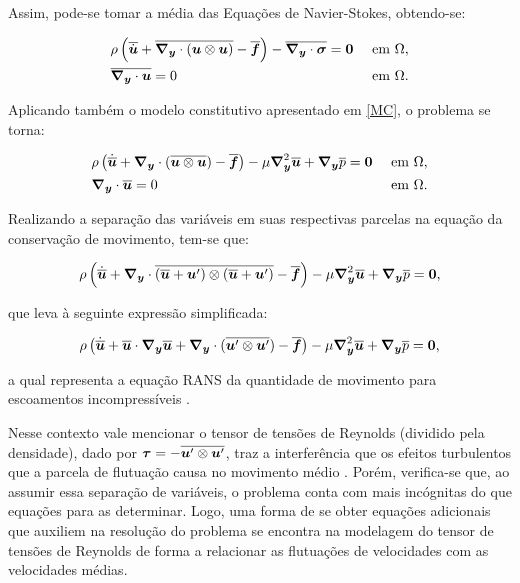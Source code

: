 Assim, pode-se tomar a média das Equações de Navier-Stokes, obtendo-se:

\begin{subequations}
    \begin{align}
         & \rho\left({\overline{\dot{\boldsymbol{u}}}+\overline{\boldsymbol{\nabla_y}\cdot(\boldsymbol{u}\otimes\boldsymbol{u})}-\overline{\boldsymbol{f}}}\right)-\overline{\boldsymbol{\nabla_y}\cdot\boldsymbol{\sigma}}=\boldsymbol{0} &  & \text{ em }\Omega\text{,} \\
         & \overline{\boldsymbol{\nabla_y}\cdot\boldsymbol{u}}=0                                                                                 &  & \text{ em }\Omega\text{.}
    \end{align}
\end{subequations}

Aplicando também o modelo constitutivo apresentado em \ref{MC}, o problema se torna:

\begin{subequations}
    \begin{align}
         & \rho\left({\dot{\overline{\boldsymbol{u}}}+\boldsymbol{\nabla_y}\cdot(\overline{\boldsymbol{u}\otimes\boldsymbol{u}})-\overline{\boldsymbol{f}}}\right)-\mu\boldsymbol{\nabla}^2_{\boldsymbol{y}}\overline{\boldsymbol{u}}+\boldsymbol{\nabla_y}\overline{p}=\boldsymbol{0} &  & \text{ em }\Omega\text{,} \\
         & \boldsymbol{\nabla_y}\cdot\overline{\boldsymbol{u}}=0                                                                                        &  & \text{ em }\Omega\text{.}
    \end{align}
\end{subequations}

Realizando a separação das variáveis em suas respectivas parcelas na equação da conservação de movimento, tem-se que:

\begin{equation}
    \rho\left({\dot{\overline{\boldsymbol{u}}}+\boldsymbol{\nabla_y}\cdot\overline{(\overline{\boldsymbol{u}}+\boldsymbol{u}')\otimes(\overline{\boldsymbol{u}}+\boldsymbol{u}')}-\overline{\boldsymbol{f}}}\right)-\mu\boldsymbol{\nabla}^2_{\boldsymbol{y}}{\overline{\boldsymbol{u}}}+\boldsymbol{\nabla_y}\overline{p}=\boldsymbol{0}\text{,}
\end{equation}

\noindent que leva à seguinte expressão simplificada:

\begin{equation}
    \rho\left({\dot{\overline{\boldsymbol{u}}}+\overline{\boldsymbol{u}}\cdot\boldsymbol{\nabla_y}\overline{\boldsymbol{u}}+\boldsymbol{\nabla_y}\cdot(\overline{\boldsymbol{u}'\otimes\boldsymbol{u}'})-\overline{\boldsymbol{f}}}\right)-\mu\boldsymbol{\nabla}^2_{\boldsymbol{y}}\overline{\boldsymbol{u}}+\boldsymbol{\nabla_y}\overline{p}=\boldsymbol{0}\text{,}
    \label{eq:RANS-estac}
\end{equation}

\noindent a qual representa a equação RANS da quantidade de movimento para escoamentos incompressíveis \cite{chou1945velocity,alfonsi2009reynolds}.

Nesse contexto vale mencionar o tensor de tensões de Reynolds (dividido pela densidade), dado por $\boldsymbol{\tau}=-\overline{\boldsymbol{u}'\otimes\boldsymbol{u}'}$, traz a interferência que os efeitos turbulentos que a parcela de flutuação causa no movimento médio \cite{chou1945velocity,alfonsi2009reynolds}. Porém, verifica-se que, ao assumir essa separação de variáveis, o problema conta com mais incógnitas do que equações para as determinar. Logo, uma forma de se obter equações adicionais que auxiliem na resolução do problema se encontra na modelagem do tensor de tensões de Reynolds de forma a relacionar as flutuações de velocidades com as velocidades médias.

